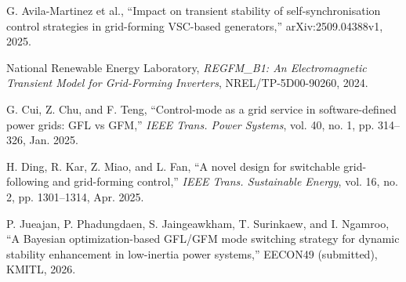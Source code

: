 \documentclass[12pt,a4paper]{article}
\begin{document}
\begin{enumerate}[label={[\arabic*]},leftmargin=2.6em]
\item\label{ref:avila} G. Avila-Martinez et al., ``Impact on transient stability of self-synchronisation control strategies in grid-forming VSC-based generators,'' arXiv:2509.04388v1, 2025.
\item\label{ref:regfmb1} National Renewable Energy Laboratory, \emph{REGFM\_B1: An Electromagnetic Transient Model for Grid-Forming Inverters}, NREL/TP-5D00-90260, 2024.
\item\label{ref:cui} G. Cui, Z. Chu, and F. Teng, ``Control-mode as a grid service in software-defined power grids: GFL vs GFM,'' \emph{IEEE Trans. Power Systems}, vol. 40, no. 1, pp. 314--326, Jan. 2025.
\item\label{ref:ding} H. Ding, R. Kar, Z. Miao, and L. Fan, ``A novel design for switchable grid-following and grid-forming control,'' \emph{IEEE Trans. Sustainable Energy}, vol. 16, no. 2, pp. 1301--1314, Apr. 2025.
\item\label{ref:eecon49} P. Jueajan, P. Phadungdaen, S. Jaingeawkham, T. Surinkaew, and I. Ngamroo, ``A Bayesian optimization-based GFL/GFM mode switching strategy for dynamic stability enhancement in low-inertia power systems,'' EECON49 (submitted), KMITL, 2026.
\end{enumerate}
\end{document}
